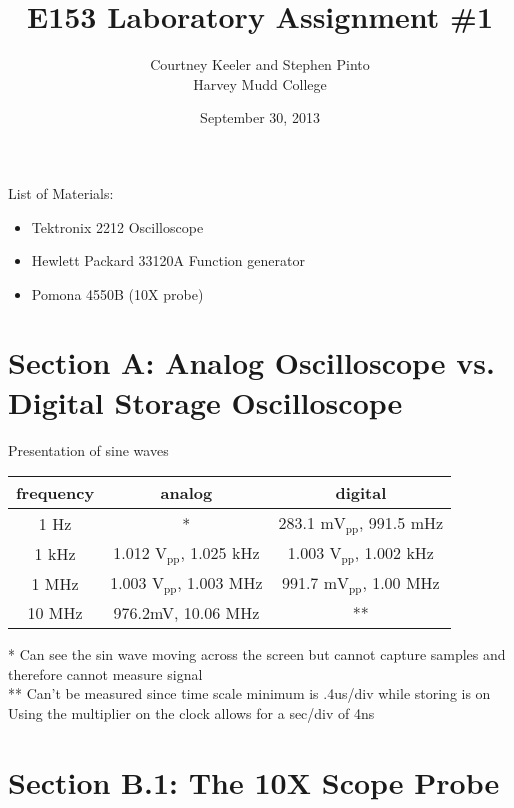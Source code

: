 \documentclass[12pt,letterpaper]{report}
\begin{document}
\title{E153 Laboratory Assignment \#1}
\author{Courtney Keeler and Stephen Pinto\\
Harvey Mudd College}
\date{September 30, 2013}
\maketitle

\begin{center}
List of Materials:
\begin{itemize}
\item Tektronix 2212 Oscilloscope
\item Hewlett Packard 33120A Function generator
\item Pomona 4550B (10X probe)
\end{itemize}
\end{center}

\section*{Section A: Analog Oscilloscope vs. Digital Storage Oscilloscope}

\begin{center}
Presentation of sine waves\\
    \begin{tabular}{| c | c | c |}
    \hline  
    frequency & analog & digital \\
    \hline
    1 Hz & * & 283.1 m$\text{V}_{\text{pp}}$, 991.5 mHz \\
    1 kHz & 1.012 $\text{V}_{\text{pp}}$, 1.025 kHz & 1.003 $\text{V}_{\text{pp}}$, 1.002 kHz \\
    1 MHz & 1.003 $\text{V}_{\text{pp}}$, 1.003 MHz & 991.7 m$\text{V}_{\text{pp}}$, 1.00 MHz \\
    10 MHz & 976.2mV, 10.06 MHz & ** \\
    \hline
    \end{tabular}
\end{center}
* Can see the sin wave moving across the screen but cannot capture samples and therefore cannot measure signal
\\[.1in]
** Can't be measured since time scale minimum is .4us/div while storing is on
\\[.3in]
Using the multiplier on the clock allows for a sec/div of 4ns
\\[.3in]

\section*{Section B.1: The 10X Scope Probe}
\end{document}
